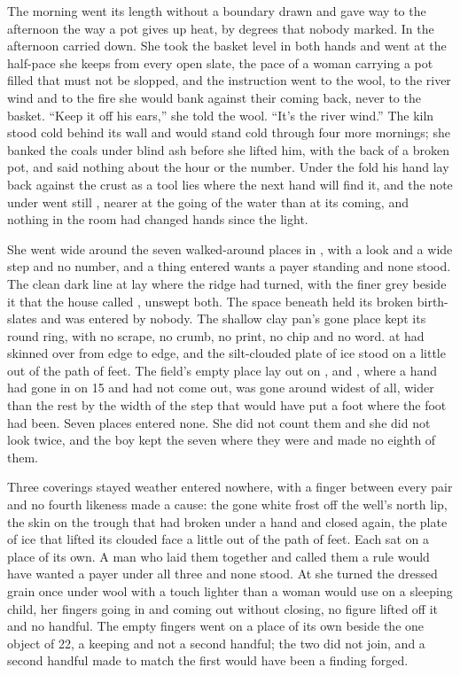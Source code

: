 The morning went its length without a boundary drawn and gave way to the afternoon the way a pot gives up heat, by degrees that nobody marked. In the afternoon  carried  down. She took the basket level in both hands and went at the half-pace she keeps from every open slate, the pace of a woman carrying a pot filled that must not be slopped, and the instruction went to the wool, to the river wind and to the fire she would bank against their coming back, never to the basket. “Keep it off his ears,” she told the wool. “It's the river wind.” The kiln stood cold behind its wall and would stand cold through four more mornings; she banked the coals under blind ash before she lifted him, with the back of a broken pot, and said nothing about the hour or the number. Under the fold his hand lay back against the crust as a tool lies where the next hand will find it, and the note under  went still , nearer at the going of the water than at its coming, and nothing in the room had changed hands since the light.

She went wide around the seven walked-around places in , with a look and a wide step and no number, and a thing entered wants a payer standing and none stood. The clean dark line at  lay where the ridge had turned, with the finer grey beside it that the house called , unswept both. The space beneath  held its broken birth-slates and was entered by nobody. The shallow clay pan's gone place kept its round ring, with no scrape, no crumb, no print, no chip and no word.  at  had skinned over from edge to edge, and the silt-clouded plate of ice stood on  a little out of the path of feet. The field's empty place lay out on , and , where a hand had gone in on  15 and had not come out, was gone around widest of all, wider than the rest by the width of the step that would have put a foot where the foot had been. Seven places entered none. She did not count them and she did not look twice, and the boy kept the seven where they were and made no eighth of them.

Three coverings stayed weather entered nowhere, with a finger between every pair and no fourth likeness made a cause: the gone white frost off the well's north lip, the skin on the trough that had broken under a hand and closed again, the plate of ice that lifted its clouded face a little out of the path of feet. Each sat on a place of its own. A man who laid them together and called them a rule would have wanted a payer under all three and none stood. At  she turned the dressed grain once under wool with a touch lighter than a woman would use on a sleeping child, her fingers going in and coming out without closing, no figure lifted off it and no handful. The empty fingers went on a place of its own beside the one object of  22, a keeping and not a second handful; the two did not join, and a second handful made to match the first would have been a finding forged.

